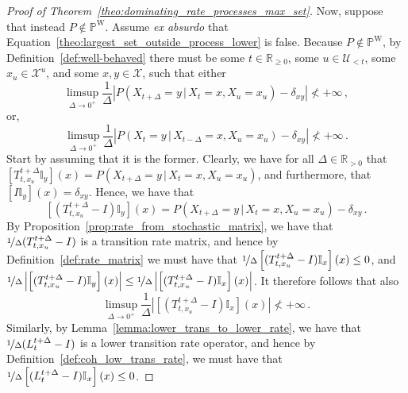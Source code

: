 \documentclass[10pt,a4paper]{paper}
\theoremstyle{definition}
\newcommand{\reals}{\mathbb{R}}
\newcommand{\realspos}{\reals_{>0}}
\newcommand{\realsnonneg}{\reals_{\geq 0}}
\newcommand{\states}{\mathcal{X}}
\newcommand{\processes}{\mathbb{P}}
\newcommand{\wprocesses}{\processes^{\mathrm{W}}}
\newcommand{\ind}[1]{\mathbb{I}_{#1}}
\newcommand{\abs}[1]{\left\vert #1 \right\vert}
\begin{document}
\begin{proof}[Proof of Theorem~\ref{theo:dominating_rate_processes_max_set}]
Now, suppose that instead $P\notin\wprocesses$. Assume \emph{ex absurdo} that Equation~\eqref{theo:largest_set_outside_process_lower} is false. Because $P\notin\wprocesses$, by Definition~\ref{def:well-behaved} there must be some $t\in\realsnonneg$, some $u\in\mathcal{U}_{<t}$, some $x_u\in\states^u$, and some $x,y\in\states$, such that either 
\begin{equation*}
\limsup_{\Delta\to0^+}\frac{1}{\Delta}\abs{P(X_{t+\Delta}=y\,\vert\,X_t=x,X_u=x_u)-\delta_{xy}}\nless+\infty\,,
\end{equation*}
or,
\begin{equation*}
\limsup_{\Delta\to0^+}\frac{1}{\Delta}\abs{P(X_{t}=y\,\vert\,X_{t-\Delta}=x,X_u=x_u)-\delta_{xy}}\nless+\infty\,.
\end{equation*}
Start by assuming that it is the former. Clearly, we have for all $\Delta\in\realspos$ that $\left[T_{t,x_u}^{t+\Delta}\ind{y}\right](x)=P(X_{t+\Delta}=y\,\vert\,X_t=x,X_u=x_u)$, and furthermore, that $\left[I\ind{y}\right](x)=\delta_{xy}$. Hence, we have that
\begin{equation*}
\left[(T_{t,x_u}^{t+\Delta}-I)\ind{y}\right](x) = P(X_{t+\Delta}=y\,\vert\,X_t=x,X_u=x_u) - \delta_{xy}\,.
\end{equation*}
By Proposition~\ref{prop:rate_from_stochastic_matrix}, we have that $\nicefrac{1}{\Delta}(T_{t,x_u}^{t+\Delta}-I)$ is a transition rate matrix, and hence by Definition~\ref{def:rate_matrix} we must have that $\nicefrac{1}{\Delta}\left[(T_{t,x_u}^{t+\Delta}-I)\ind{x}\right](x)\leq 0$, and $\nicefrac{1}{\Delta}\abs{\left[(T_{t,x_u}^{t+\Delta}-I)\ind{y}\right](x)}\leq\nicefrac{1}{\Delta}\abs{\left[(T_{t,x_u}^{t+\Delta}-I)\ind{x}\right](x)}$. It therefore follows that also
\begin{equation}\label{eq:nonwellbehaved_limit_diagonal}
\limsup_{\Delta\to0^+}\frac{1}{\Delta}\abs{\left[(T_{t,x_u}^{t+\Delta}-I)\ind{x}\right](x)} \nless +\infty\,.
\end{equation}
Similarly, by Lemma~\ref{lemma:lower_trans_to_lower_rate}, we have that $\nicefrac{1}{\Delta}(L_t^{t+\Delta}-I)$ is a lower transition rate operator, and hence by Definition~\ref{def:coh_low_trans_rate}, we must have that $\nicefrac{1}{\Delta}\left[(L_t^{t+\Delta}-I)\ind{x}\right](x)\leq 0$. 


\end{proof}
\end{document}
